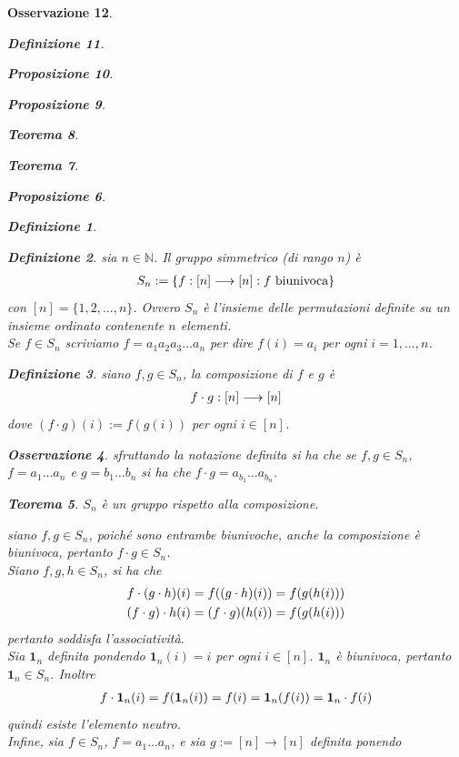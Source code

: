 \documentclass[oneside, 11pt]{amsbook}
\makeatletter
\newcommand{\0}{{(0)}}
\newcommand{\3}{{(3)}}
\theoremstyle{colonplain}
\newtheorem{thm}{Teorema}[chapter]
\newtheorem{prop}[thm]{Proposizione}
\theoremstyle{colondefinition}
\newtheorem{defn}[thm]{Definizione}
\theoremstyle{colonremark}
\newtheorem{rmk}[thm]{Osservazione}
\numberwithin{equation}{chapter}
\renewcommand{\proofname}{Dimostrazione}
\renewenvironment{proof}[1][\proofname]{\par
  \pushQED{\end{proof}}%
  \normalfont \topsep6\p@\@plus6\p@\relax
  \trivlist
  \item[\hskip\labelsep\bfseries #1:]\ignorespaces
}{%
  \popQED\endtrivlist\@endpefalse
}
\makeatother
\begin{document}
\begin{rmk}
\begin{defn}
\begin{prop}
\begin{prop}
\begin{thm}
\begin{thm}
\begin{prop}
\begin{defn}
\end{defn}
\begin{defn}
sia $n \in \mathbb{N}$. Il gruppo simmetrico (di rango $n$) è
\begin{align}
    S_n := \{ f : [n] \longrightarrow [n] : f \text{ biunivoca} \} \notag
\end{align}
con $[n] = \{1, 2, \dots, n \}$. Ovvero $S_n$ è l'insieme delle permutazioni definite su un insieme ordinato contenente $n$ elementi. \\
Se $f \in S_n$ scriviamo $f = a_1a_2a_3 \dots a_n$ per dire $f(i) = a_i$ per ogni $i = 1, \dots, n$.
\end{defn}
\begin{defn}
siano $f, g \in S_n$, la composizione di $f$ e $g$ è
\begin{align}
    f \cdot g : [n] \longrightarrow [n] \notag
\end{align}
dove $(f \cdot g) (i) := f(g(i))$ per ogni $i \in [n]$.
\end{defn}
\begin{rmk}
sfruttando la notazione definita si ha che se $f, g \in S_n$, \\ $f = a_1 \dots a_n$ e $g = b_1 \dots b_n$ si ha che $f \cdot g = a_{b_1} \dots a_{b_n}$.
\end{rmk}
\begin{thm}
$S_n$ è un gruppo rispetto alla composizione.
\end{thm}
\begin{proof} 
siano $f, g \in S_n$, poiché sono entrambe biunivoche, anche la composizione è biunivoca, pertanto $f \cdot g \in S_n$. \\
Siano $f, g, h \in S_n$, si ha che
\begin{align}
    f \cdot (g \cdot h)(i) = f((g \cdot h)(i)) = f(g(h(i))) \notag \\
    (f \cdot g) \cdot h(i) = (f \cdot g)(h(i)) = f(g(h(i))) \notag
\end{align}
pertanto soddisfa l'associatività. \\
Sia $\mathbf{1}_n$ definita pondendo $\mathbf{1}_n(i) = i$ per ogni $i \in [n]$. $\mathbf{1}_n$ è biunivoca, pertanto $\mathbf{1}_n \in S_n$. Inoltre
\begin{align}
    f \cdot \mathbf{1}_n (i) = f(\mathbf{1}_n(i)) = f(i) = \mathbf{1}_n (f(i)) = \mathbf{1}_n \cdot f (i) \notag
\end{align}
quindi esiste l'elemento neutro. \\
Infine, sia $f \in S_n$, $f = a_1 \dots a_n$, e sia $g := [n] \longrightarrow [n]$ definita ponendo

\end{proof}
\end{prop}
\end{thm}
\end{thm}
\end{prop}
\end{prop}
\end{defn}
\end{rmk}
\end{document}
